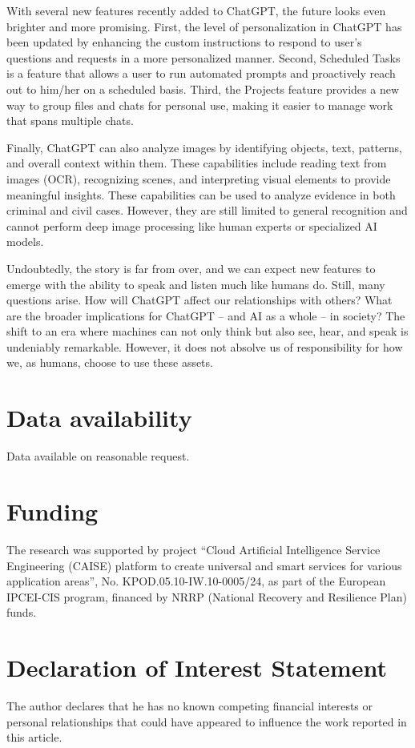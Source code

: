 \documentclass[preprint,12pt,number]{elsarticle}
\begin{document}
With several new features recently added to ChatGPT, the future looks even brighter and more promising. First, the level of personalization in ChatGPT has been updated by enhancing the custom instructions to respond to user's questions and requests in a more personalized manner. Second, Scheduled Tasks is a feature that allows a user to run automated prompts and proactively reach out to him/her on a scheduled basis. Third, the Projects feature provides a new way to group files and chats for personal use, making it easier to manage work that spans multiple chats.

Finally, ChatGPT can also analyze images by identifying objects, text, patterns, and overall context within them. These capabilities include reading text from images (OCR), recognizing scenes, and interpreting visual elements to provide meaningful insights. These capabilities can be used to analyze evidence in both criminal and civil cases. However, they are still limited to general recognition and cannot perform deep image processing like human experts or specialized AI models.

Undoubtedly, the story is far from over, and we can expect new features to emerge with the ability to speak and listen much like humans do. Still, many questions arise. How will ChatGPT affect our relationships with others? What are the broader implications for ChatGPT -- and AI as a whole -- in society? The shift to an era where machines can not only think but also see, hear, and speak is undeniably remarkable. However, it does not absolve us of responsibility for how we, as humans, choose to use these assets.

\section*{Data availability}
Data available on reasonable request.

\section*{Funding}
The research was supported by project “Cloud Artificial Intelligence Service Engineering (CAISE) platform to create universal and smart services for various application areas”, No. KPOD.05.10-IW.10-0005/24, as part of the European IPCEI-CIS program, financed by NRRP (National Recovery and Resilience Plan) funds.


\section*{Declaration of Interest Statement}
The author declares that he has no known competing financial interests or personal relationships that could have appeared to influence the work reported in this article.
\end{document}
